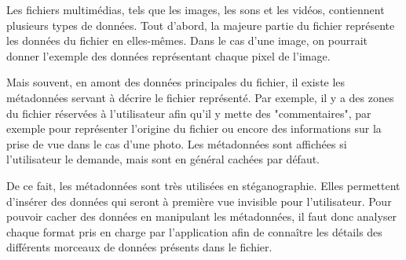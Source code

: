 \documentclass[11pt]{article}
\begin{document}
Les fichiers multimédias, tels que les images, les sons et les vidéos,
contiennent plusieurs types de données. Tout d'abord, la majeure partie du
fichier représente les données du fichier en elles-mêmes. Dans le cas d'une
image, on pourrait donner l'exemple des données représentant chaque pixel de
l'image. 

Mais souvent, en amont des données principales du fichier, il existe les
métadonnées servant à décrire le fichier représenté. Par exemple, il y a 
des zones du fichier réservées à l'utilisateur afin qu'il y mette des 
 "commentaires", par exemple pour représenter l'origine du fichier ou 
encore des informations sur la prise de vue dans le cas d'une photo. 
Les métadonnées sont affichées si l'utilisateur le demande, mais sont en 
général cachées par défaut.

De ce fait, les métadonnées sont très utilisées en stéganographie. Elles
permettent d'insérer des données qui seront à première vue invisible pour
l'utilisateur. Pour pouvoir cacher des données en manipulant les métadonnées,
il faut donc analyser chaque format pris en charge par l'application afin de
connaître les détails des différents morceaux de données présents dans le
fichier. 
\end{document}
